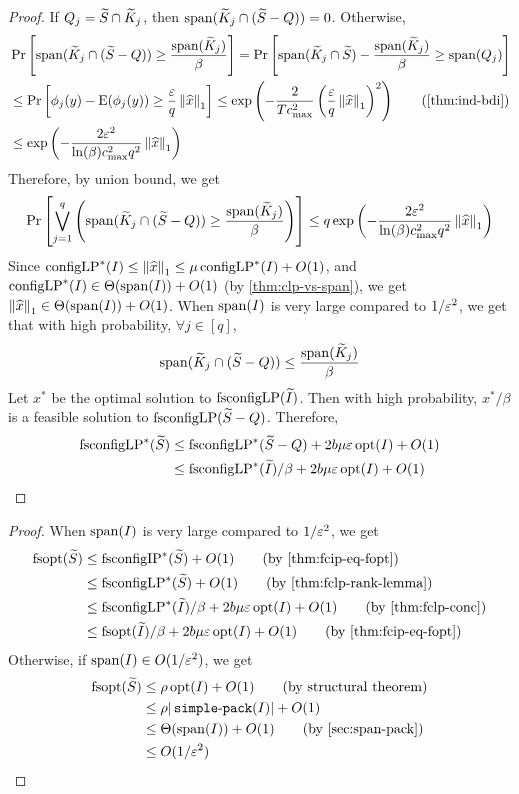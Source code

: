 \begin{proof}
If $Q_j = \widetilde{S} \cap \widetilde{K}_j$, then $\operatorname{span}(\widetilde{K}_j \cap (\widetilde{S} - Q)) = 0$.
Otherwise,
\begin{align*}
& \Pr\left[ \Span(\Ktild_j \cap (\Stild - Q)) \ge \frac{\Span(\Ktild_j)}{\beta} \right]
= \Pr\left[ \Span(\Ktild_j \cap \Stild) - \frac{\Span(\Ktild_j)}{\beta} \ge \Span(Q_j) \right]
\\ &\le \Pr\left[ \phi_j(y) - \E(\phi_j(y)) \ge \frac{\epsLP}{q} \norm{\widehat{x}}_1 \right]
\le \exp\left( -\frac{2}{Tc_{\max}^2} \left(\frac{\epsLP}{q}\norm{\widehat{x}}_1\right)^2\right)
\tag{\cref{thm:ind-bdi}}
\\ &\le \exp\left( -\frac{2\epsLP^2}{\ln(\beta)c_{\max}^2q^2} \norm{\widehat{x}}_1\right)
\end{align*}
Therefore, by union bound, we get
\[ \Pr\left[ \bigvee_{j=1}^q \left(\operatorname{span}(\widetilde{K}_j \cap (\widetilde{S} - Q))
    \ge \frac{\operatorname{span}(\widetilde{K}_j)}{\beta}\right) \right]
\le q\exp\left( -\frac{2\varepsilon^2}{\ln(\beta)c_{\max}^2q^2} \left\lVert \widehat{x} \right\rVert_1\right) \]
Since $\operatorname{configLP}^*(I) \le \left\lVert \widehat{x} \right\rVert_1 \le \mu \operatorname{configLP}^*(I) + O(1)$,
and $\operatorname{configLP}^*(I) \in \Theta(\operatorname{span}(I)) + O(1)$ (by \cref{thm:clp-vs-span}),
we get $\left\lVert \widehat{x} \right\rVert_1 \in \Theta(\operatorname{span}(I)) + O(1)$.
When $\operatorname{span}(I)$ is very large compared to $1/\varepsilon^2$, we get
that with high probability, $\forall j \in [q]$,
\[ \operatorname{span}(\widetilde{K}_j \cap (\widetilde{S} - Q)) \le \frac{\operatorname{span}(\widetilde{K}_j)}{\beta} \]
Let $x^*$ be the optimal solution to $\operatorname{fsconfigLP}(\widetilde{I})$.
Then with high probability, $x^*/\beta$ is a feasible solution to $\operatorname{fsconfigLP}(\widetilde{S} - Q)$.
Therefore,
\begin{align*}
\operatorname{fsconfigLP}^*(\widetilde{S})
&\le \operatorname{fsconfigLP}^*(\widetilde{S} - Q) + 2b\mu\varepsilon \operatorname{opt}(I) + O(1)
\\ &\le \operatorname{fsconfigLP}^*(\widetilde{I})/\beta + 2b\mu\varepsilon \operatorname{opt}(I) + O(1)
\qedhere \end{align*}
\end{proof}

\rthmFoptConc*
\begin{proof}
When $\operatorname{span}(I)$ is very large compared to $1/\varepsilon^2$, we get
\begin{align*}
\fsopt(\Stild) &\le \fscIP^*(\Stild) + O(1)  \tag{by \cref{thm:fcip-eq-fopt}}
\\ &\le \fscLP^*(\Stild) + O(1)  \tag{by \cref{thm:fclp-rank-lemma}}
\\ &\le \fscLP^*(\Itild)/\beta + 2b\mu\epsLP \opt(I) + O(1)  \tag{by \cref{thm:fclp-conc}}
\\ &\le \fsopt(\Itild)/\beta + 2b\mu\epsLP \opt(I) + O(1)  \tag{by \cref{thm:fcip-eq-fopt}}
\end{align*}
Otherwise, if $\operatorname{span}(I) \in O(1/\varepsilon^2)$, we get
\begin{align*}
\fsopt(\Stild) &\le \rho\opt(I) + O(1)  \tag{by structural theorem}
\\ &\le \rho|\simplePack(I)| + O(1)
\\ &\le \Theta(\Span(I)) + O(1)  \tag{by \cref{sec:span-pack}}
\\ &\le O(1/\epsLP^2)  \qedhere
\end{align*}
\end{proof}

